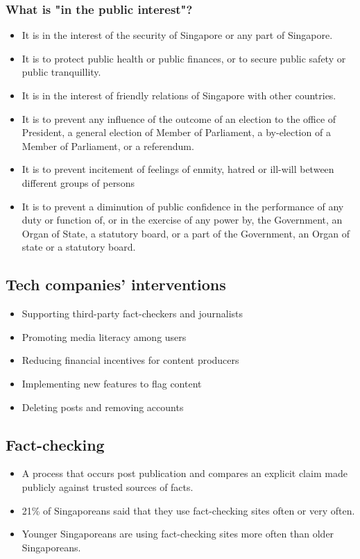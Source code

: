 \documentclass[11pt]{article}
\begin{document}
\subsubsection{What is "in the public interest"?}
\label{sec:org78074aa}
\begin{itemize}
\item It is in the interest of the security of Singapore or any part of Singapore.
\item It is to protect public health or public finances, or to secure public safety or public tranquillity.
\item It is in the interest of friendly relations of Singapore with other countries.
\item It is to prevent any influence of the outcome of an election to the office of President, a general election of Member of Parliament, a by-election of a Member of Parliament, or a referendum.
\item It is to prevent incitement of feelings of enmity, hatred or ill-will between different groups of persons
\item It is to prevent a diminution of public confidence in the performance of any duty or function of, or in the exercise of any power by, the Government, an Organ of State, a statutory board, or a part of the Government, an Organ of state or a statutory board.
\end{itemize}

\subsection{Tech companies' interventions}
\label{sec:orgcf988e6}
\begin{itemize}
\item Supporting third-party fact-checkers and journalists
\item Promoting media literacy among users
\item Reducing financial incentives for content producers
\item Implementing new features to flag content
\item Deleting posts and removing accounts
\end{itemize}

\subsection{Fact-checking}
\label{sec:orgd16b9a7}
\begin{itemize}
\item A process that occurs post publication and compares an explicit claim made publicly against trusted sources of facts.
\item 21\% of Singaporeans said that they use fact-checking sites often or very often.
\item Younger Singaporeans are using fact-checking sites more often than older Singaporeans.
\end{itemize}
\end{document}
